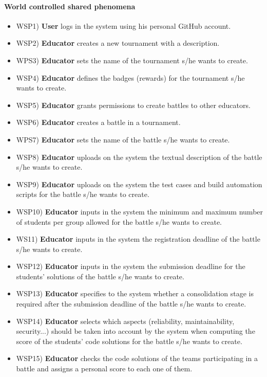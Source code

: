 	\paragraph{World controlled shared phenomena}
	\begin{itemize}
		\item WSP1) \textbf{User} logs in the system using his personal GitHub account.
		\item WSP2) \textbf{Educator} creates a new tournament with a description.
		\item WPS3) \textbf{Educator} sets the name of the tournament s/he wants to create.
		\item WSP4) \textbf{Educator} defines the badges (rewards) for the tournament s/he wants to create.
		\item WSP5) \textbf{Educator} grants permissions to create battles to other educators.
		\item WSP6) \textbf{Educator} creates a battle in a tournament.
		\item WPS7) \textbf{Educator} sets the name of the battle s/he wants to create.
		\item WSP8) \textbf{Educator} uploads on the system the textual description of the battle s/he wants to create.
		\item WSP9) \textbf{Educator} uploads on the system the test cases and build automation scripts for the battle s/he wants to create.
		\item WSP10) \textbf{Educator} inputs in the system the minimum and maximum number of students per group allowed for the battle s/he wants to create.
		\item WS11) \textbf{Educator} inputs in the system the registration deadline of the battle s/he wants to create.
		\item WSP12) \textbf{Educator} inputs in the system the submission deadline for the students’ solutions of the battle s/he wants to create.
		\item WSP13) \textbf{Educator} specifies to the system whether a consolidation stage is required after the submission deadline of the battle s/he wants to create.
		\item WSP14) \textbf{Educator} selects which aspects (reliability, maintainability, security...) should be taken into account by the system when computing the score of the students' code solutions for the battle s/he wants to create.
		\item WSP15) \textbf{Educator} checks the code solutions of the teams participating in a battle and assigns a personal score to each one of them.

\end{itemize}
